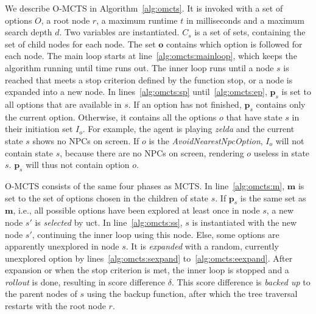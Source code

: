 We describe O-MCTS in Algorithm~\ref{alg:omcts}. It is invoked with a set of
options $O$, a root node $r$, a maximum runtime $t$ in milliseconds and a
maximum search depth $d$. Two variables are instantiated. $C_s$ is a set of
sets, containing the set of child nodes for each node. The set $\mathbf{o}$
contains which option is followed for each node. The main loop starts at 
line~\ref{alg:omcts:mainloop}, which keeps the algorithm running until time runs out.
The inner loop runs until a node $s$ is reached that meets a stop criterion
defined by the function \textsf{stop}, or a node is expanded into a new node.
In lines~\ref{alg:omcts:sp} until~\ref{alg:omcts:ep}, $\mathbf{p}_s$ is set to
all options that are available in $s$. If an option has not finished,
$\mathbf{p}_s$ contains only the current option. Otherwise, it contains all the
options $o$ that have state $s$ in their initiation set $I_o$. For example, the
agent is playing \textit{zelda} and the current state $s$ shows no NPCs on
screen. If $o$ is the \textit{AvoidNearestNpcOption}, $I_o$ will not contain
state $s$, because there are no NPCs on screen, rendering $o$ useless in state
$s$. $\mathbf{p}_s$ will thus not contain option $o$.

O-MCTS consists of the same four phases as MCTS\@. In line~\ref{alg:omcts:m},
$\mathbf{m}$ is set to the set of options chosen in the children of state $s$.
If $\mathbf{p}_s$ is the same set as $\mathbf{m}$, i.e., all possible options
have been explored at least once in node $s$, a new node $s'$ is \emph{selected}
by \textsf{uct}. In line~\ref{alg:omcts:ss}, $s$ is instantiated with the new
node $s'$, continuing the inner loop using this node.  Else, some options are
apparently unexplored in node $s$. It is \emph{expanded} with a random,
currently unexplored option by lines~\ref{alg:omcts:sexpand}
to~\ref{alg:omcts:eexpand}. After expansion or when the stop criterion is met,
the inner loop is stopped and a \emph{rollout} is done, resulting in score
difference $\delta$. This score difference is \emph{backed up} to the parent
nodes of $s$ using the backup function, after which the tree traversal restarts
with the root node $r$.

